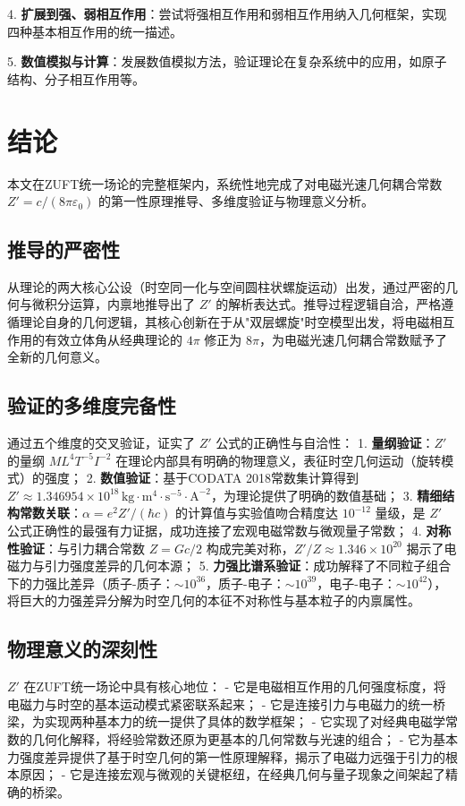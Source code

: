 \documentclass[a4paper,12pt]{article}
\theoremstyle{plain}
\begin{document}
4. \textbf{扩展到强、弱相互作用}：尝试将强相互作用和弱相互作用纳入几何框架，实现四种基本相互作用的统一描述。

5. \textbf{数值模拟与计算}：发展数值模拟方法，验证理论在复杂系统中的应用，如原子结构、分子相互作用等。

\section{结论}
本文在ZUFT统一场论的完整框架内，系统性地完成了对电磁光速几何耦合常数 $Z' = c/(8\pi\varepsilon_0)$ 的第一性原理推导、多维度验证与物理意义分析。

\subsection{推导的严密性}
从理论的两大核心公设（时空同一化与空间圆柱状螺旋运动）出发，通过严密的几何与微积分运算，内禀地推导出了 $Z'$ 的解析表达式。推导过程逻辑自洽，严格遵循理论自身的几何逻辑，其核心创新在于从"双层螺旋"时空模型出发，将电磁相互作用的有效立体角从经典理论的 $4\pi$ 修正为 $8\pi$，为电磁光速几何耦合常数赋予了全新的几何意义。

\subsection{验证的多维度完备性}
通过五个维度的交叉验证，证实了 $Z'$ 公式的正确性与自洽性：
1. \textbf{量纲验证}：$Z'$ 的量纲 $M L^4 T^{-5} I^{-2}$ 在理论内部具有明确的物理意义，表征时空几何运动（旋转模式）的强度；
2. \textbf{数值验证}：基于CODATA 2018常数集计算得到 $Z' \approx 1.346954\times10^{18} \, \text{kg} \cdot \text{m}^4 \cdot \text{s}^{-5} \cdot \text{A}^{-2}$，为理论提供了明确的数值基础；
3. \textbf{精细结构常数关联}：$\alpha = e^2Z'/(\hbar c)$ 的计算值与实验值吻合精度达 $10^{-12}$ 量级，是 $Z'$ 公式正确性的最强有力证据，成功连接了宏观电磁常数与微观量子常数；
4. \textbf{对称性验证}：与引力耦合常数 $Z = Gc/2$ 构成完美对称，$Z'/Z \approx 1.346\times10^{20}$ 揭示了电磁力与引力强度差异的几何本源；
5. \textbf{力强比谱系验证}：成功解释了不同粒子组合下的力强比差异（质子-质子：$\sim10^{36}$，质子-电子：$\sim10^{39}$，电子-电子：$\sim10^{42}$），将巨大的力强差异分解为时空几何的本征不对称性与基本粒子的内禀属性。

\subsection{物理意义的深刻性}
$Z'$ 在ZUFT统一场论中具有核心地位：
- 它是电磁相互作用的几何强度标度，将电磁力与时空的基本运动模式紧密联系起来；
- 它是连接引力与电磁力的统一桥梁，为实现两种基本力的统一提供了具体的数学框架；
- 它实现了对经典电磁学常数的几何化解释，将经验常数还原为更基本的几何常数与光速的组合；
- 它为基本力强度差异提供了基于时空几何的第一性原理解释，揭示了电磁力远强于引力的根本原因；
- 它是连接宏观与微观的关键枢纽，在经典几何与量子现象之间架起了精确的桥梁。
\end{document}
